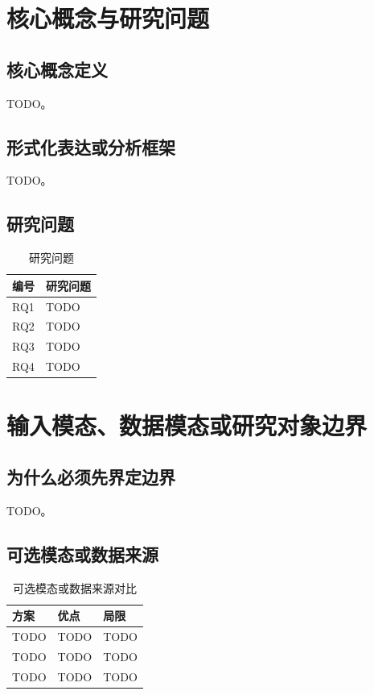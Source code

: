 \documentclass[UTF8,a4paper,11pt]{ctexart}
\begin{document}
\section{核心概念与研究问题}

\subsection{核心概念定义}

TODO。

\subsection{形式化表达或分析框架}

TODO。

\subsection{研究问题}

\begin{table}[H]
\centering
\caption{研究问题}
\begin{tabularx}{\textwidth}{p{2cm}X}
\toprule
\textbf{编号} & \textbf{研究问题} \\
\midrule
RQ1 & TODO \\
\midrule
RQ2 & TODO \\
\midrule
RQ3 & TODO \\
\midrule
RQ4 & TODO \\
\bottomrule
\end{tabularx}
\end{table}

\section{输入模态、数据模态或研究对象边界}

\subsection{为什么必须先界定边界}

TODO。

\subsection{可选模态或数据来源}

\begin{table}[H]
\centering
\caption{可选模态或数据来源对比}
\begin{tabularx}{\textwidth}{p{3cm}XX}
\toprule
\textbf{方案} & \textbf{优点} & \textbf{局限} \\
\midrule
TODO & TODO & TODO \\
\midrule
TODO & TODO & TODO \\
\midrule
TODO & TODO & TODO \\
\bottomrule
\end{tabularx}
\end{table}
\end{document}
